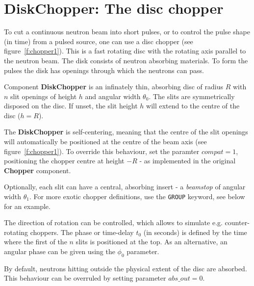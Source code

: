 
\section{DiskChopper: The disc chopper}
\label{s:chopper}


To cut a continuous neutron beam into short pulses, or to control
the pulse shape (in time) from a pulsed source, one can use a disc
chopper (see figure~\ref{f:chopper1}). This is a fast rotating disc with the
rotating axis parallel to the neutron beam. The disk consists of neutron
absorbing materials. To form the pulses the disk has openings through which
the neutrons can pass.

Component \textbf{DiskChopper} is an infinately thin, absorbing disc of
radius $R$ with $n$ slit openings of height $h$ and angular width
$\theta_0$. The slits are symmetrically disposed on the disc. If
unset, the slit height $h$ will extend to the centre of the disc ($h=R$).

The \textbf{DiskChopper} is self-centering, meaning that the centre of
the slit openings will automatically be positioned at the centre of
the beam axis (see figure~\ref{f:chopper1}). To override this behaviour, set the paramter
$compat=1$, positioning the chopper centre at height $-R$ - as
implemented in the original \textbf{Chopper} component.

Optionally, each slit can have a central, absorbing insert - a
\emph{beamstop} of angular width $\theta_1$. For more exotic chopper
definitions, use the \texttt{GROUP} keyword, see below for an example.

The direction of rotation can be controlled,
which allows to simulate e.g. counter-rotating choppers.
The phase or time-delay $t_0$ (in seconds) is defined by the time
where the first of the $n$ slits is positioned at the top. As an
alternative, an angular phase can be given using the $\phi_0$ parameter.

By default, neutrons hitting outside the physical extent of the disc
are absorbed. This behaviour can be overruled by setting parameter
$abs\_out=0$.


